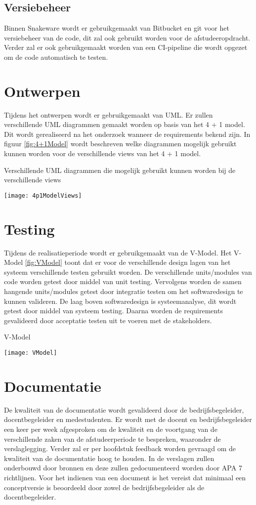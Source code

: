\subsection{Versiebeheer}
Binnen Snakeware wordt er gebruikgemaakt van Bitbucket en git voor het versiebeheer van de code, dit zal ook gebruikt worden voor de afstudeeropdracht.
Verder zal er ook gebruikgemaakt worden van een CI-pipeline die wordt opgezet om de code automatisch te testen.
\section{Ontwerpen}
\label{sec:Ontwerpen}
Tijdens het ontwerpen wordt er gebruikgemaakt van UML.
Er zullen verschillende UML diagrammen gemaakt worden op basis van het 4 + 1 model.
Dit wordt gerealiseerd na het onderzoek wanneer de requirements bekend zijn.
In figuur \ref{fig:4+1Model} wordt beschreven welke diagrammen mogelijk gebruikt kunnen worden voor de verschillende views van het 4 + 1 model.
\begin{graphic}
    \captionsetup{type=figure}
    \caption{Verschillende UML diagrammen die mogelijk gebruikt kunnen worden bij de verschillende views \Parencite{4p1ModelViews}}
    \texttt{[image: 4p1ModelViews]}
    \label{fig:4+1Model}
\end{graphic}
\section{Testing}
\label{sec:Testing}
Tijdens de realisatieperiode wordt er gebruikgemaakt van de V-Model.
Het V-Model \ref{fig:VModel} toont dat er voor de verschillende design lagen van het systeem verschillende testen gebruikt worden.
De verschillende units/modules van code worden getest door middel van unit testing.
Vervolgens worden de samen hangende units/modules getest door integratie testen om het softwaredesign te kunnen valideren.
De laag boven softwaredesign is systeemanalyse, dit wordt getest door middel van systeem testing.
Daarna worden de requirements gevalideerd door acceptatie testen uit te voeren met de stakeholders.
\begin{graphic}
    \captionsetup{type=figure}
    \caption{V-Model \Parencite{VModel}}
    \texttt{[image: VModel]}
    \label{fig:VModel}
\end{graphic}
\section{Documentatie}
De kwaliteit van de documentatie wordt gevalideerd door de bedrijfsbegeleider, docentbegeleider en medestudenten.
Er wordt met de docent en bedrijfsbegeleider een keer per week afgesproken om de kwaliteit en de voortgang van de verschillende zaken van de afstudeerperiode te bespreken, waaronder de verslaglegging.
Verder zal er per hoofdstuk feedback worden gevraagd om de kwaliteit van de documentatie hoog te houden.
In de verslagen zullen onderbouwd door bronnen en deze zullen gedocumenteerd worden door APA 7 richtlijnen.
Voor het indienen van een document is het vereist dat minimaal een conceptversie is beoordeeld door zowel de bedrijfsbegeleider als de docentbegeleider.
